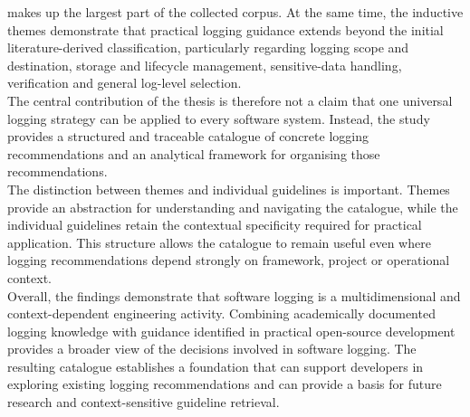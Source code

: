 makes up the largest part of the collected corpus. At the same time, the inductive 
themes demonstrate that practical logging guidance extends beyond the initial literature-derived
classification, particularly regarding logging scope and destination, storage and lifecycle management,
sensitive-data handling, verification and general log-level selection.
\\
The central contribution of the thesis is therefore not a claim that one universal 
logging strategy can be applied to every software system. Instead, the study provides 
a structured and traceable catalogue of concrete logging recommendations and an analytical 
framework for organising those recommendations.
\\
The distinction between themes and individual guidelines is important. 
Themes provide an abstraction for understanding and navigating the catalogue, 
while the individual guidelines retain the contextual specificity required for 
practical application. This structure allows the catalogue to remain useful even 
where logging recommendations depend strongly on framework, project or operational context.
\\
Overall, the findings demonstrate that software logging is a multidimensional
and context-dependent engineering activity. Combining academically documented
logging knowledge with guidance identified in practical open-source development
provides a broader view of the decisions involved in software logging. The
resulting catalogue establishes a foundation that can support developers in
exploring existing logging recommendations and can provide a basis for future
research and context-sensitive guideline retrieval.